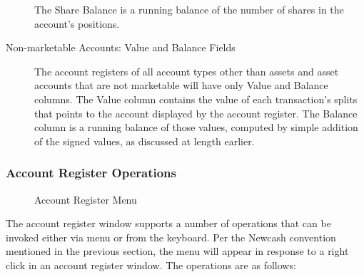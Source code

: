\documentclass{report}
\newcommand{\graphicsfig}[5]{
\begin{figure}[#5]
\begin{center}
\resizebox{#1}{!}{\texttt{[image: \#2]}}
\end{center}
\caption{#3}
\label{#4}
\end{figure}
}
\begin{document}
\begin{description}
The Share Balance is a running balance of the number of shares in the account's positions.
\item[Non-marketable Accounts: Value and Balance Fields]
The account registers of all account types other than assets and asset accounts that are not marketable will have only Value and Balance columns. The Value column contains the value of each transaction's splits that points to the account displayed by the account register. The Balance column is a running balance of those values, computed by simple addition of the signed values, as discussed at length earlier.
\end{description}

\subsubsection{Account Register Operations}
\label{Account Register Operations}
\graphicsfig{5in}{figures/account_register_menu.png}{Account Register Menu}{Account Register Menu}{}
The account register window supports a number of operations that can be invoked either via menu or from the keyboard. Per the Newcash convention mentioned in the previous section, the menu will appear in response to a right click in an account register window. The operations are as follows:
\end{document}
